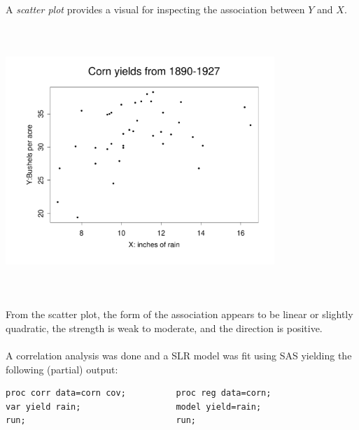 A {\em scatter plot} provides a visual for inspecting the association between $Y$ and $X$.  
\begin{center}
\includegraphics[height=4in,width=4in]{cornyield.pdf}
\end{center}
From the scatter plot, the form of the association appears to be linear or slightly quadratic, the strength is weak to moderate, and the direction is positive.\\~\\

A correlation analysis was done and a SLR model was fit using SAS yielding the following (partial) output:
\begin{small}
\begin{verbatim}
proc corr data=corn cov;          proc reg data=corn;
var yield rain;                   model yield=rain;
run;                              run;
\end{verbatim}
\end{small}

